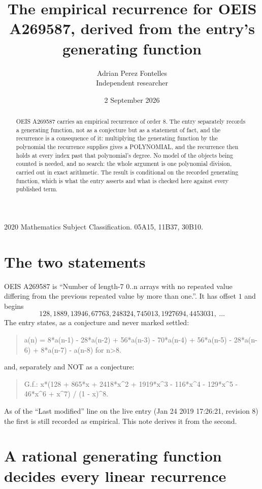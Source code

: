 \documentclass[11pt,a4paper]{article}
\title{The empirical recurrence for OEIS A269587, derived from the entry's generating function}
\author{Adrian Perez Fontelles\\ \small Independent researcher}
\date{2 September 2026}
\theoremstyle{plain}
\theoremstyle{definition}
\begin{document}
\maketitle

\begin{abstract}
OEIS A269587 carries an empirical recurrence of order $8$. The entry separately records a
generating function, not as a conjecture but as a statement of fact, and the recurrence is a
consequence of it: multiplying the generating function by the polynomial the recurrence
supplies gives a POLYNOMIAL, and the recurrence then holds at every index past that
polynomial's degree. No model of the objects being counted is needed, and no search: the
whole argument is one polynomial division, carried out in exact arithmetic. The result is
conditional on the recorded generating function, which is what the entry asserts and what is
checked here against every published term.
\end{abstract}

\noindent\small 2020 Mathematics Subject Classification. 05A15, 11B37, 30B10.\normalsize

\section{The two statements}

OEIS A269587 is ``Number of length-7 0..n arrays with no repeated value differing from the previous repeated value by more than one.''. It has offset $1$ and begins
\[
128, 1889, 13946, 67763, 248324, 745013, 1927694, 4453031,\ \dots
\]
The entry states, as a conjecture and never marked settled:
\begin{quote}
a(n) = 8*a(n-1) - 28*a(n-2) + 56*a(n-3) - 70*a(n-4) + 56*a(n-5) - 28*a(n-6) + 8*a(n-7) - a(n-8) for n>8.
\end{quote}
and, separately and NOT as a conjecture:
\begin{quote}
G.f.: x*(128 + 865*x + 2418*x\^{}2 + 1919*x\^{}3 - 116*x\^{}4 - 129*x\^{}5 - 46*x\^{}6 + x\^{}7) / (1 - x)\^{}8.
\end{quote}
As of the ``Last modified'' line on the live entry (Jan 24 2019 17:26:21, revision 8) the first is still
recorded as empirical. This note derives it from the second.

\section{A rational generating function decides every linear recurrence}
\end{document}
